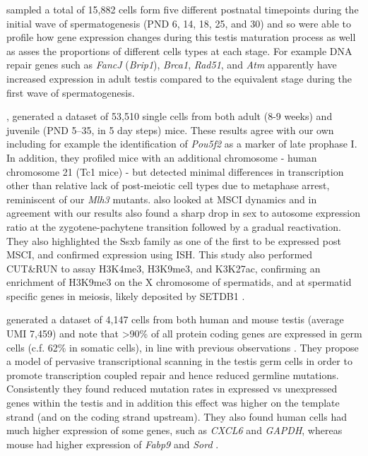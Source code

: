 \cite{Grive2019Dynamic} sampled a total of 15,882 cells form five different postnatal timepoints during the initial wave of spermatogenesis (PND 6, 14, 18, 25, and 30) and so were able to profile how gene expression changes during this testis maturation process as well as asses the proportions of different cells types at each stage. For example DNA repair genes such as \textit{FancJ} (\textit{Brip1}), \textit{Brca1}, \textit{Rad51}, and \textit{Atm} apparently have increased expression in adult testis compared to the equivalent stage during the first wave of spermatogenesis.

\cite{Ernst2019Staged}, generated a dataset of 53,510 single cells from both adult (8-9 weeks) and juvenile (PND 5–35, in 5 day steps) mice. These results agree with our own including for example the identification of \textit{Pou5f2} as a marker of late prophase I. In addition, they profiled mice with an additional chromosome - human chromosome 21 (Tc1 mice) - but detected minimal differences in transcription other than relative lack of post-meiotic cell types due to metaphase arrest, reminiscent of our \textit{Mlh3} mutants. \cite{Ernst2019Staged} also looked at MSCI dynamics and in agreement with our results also found a sharp drop in sex to autosome expression ratio at the zygotene-pachytene transition followed by a gradual reactivation. They also highlighted the Ssxb family as one of the first to be expressed post MSCI, and confirmed expression using ISH. This study also performed CUT\&RUN to assay H3K4me3, H3K9me3, and K3K27ac, confirming an enrichment of H3K9me3 on the X chromosome of spermatids, and at spermatid specific genes in meiosis, likely deposited by SETDB1 \parencite{Hirota2018SETDB1}.

\cite{Xia2019Widespread} generated a dataset of 4,147 cells from both human and mouse testis (average UMI 7,459) and note that >90\% of all protein coding genes are expressed in germ cells (c.f. 62\% in somatic cells), in line with previous observations \parencite{Soumillon2013Cellular, Schmidt1996Transcriptional}. They propose a model of pervasive transcriptional scanning in the testis germ cells in order to promote transcription coupled repair and hence reduced germline mutations. Consistently they found reduced mutation rates in expressed vs unexpressed genes within the testis and in addition this effect was higher on the template strand (and on the coding strand upstream). They also found human cells had much higher expression of some genes, such as \textit{CXCL6} and \textit{GAPDH}, whereas mouse had higher expression of \textit{Fabp9} and \textit{Sord} \parencite{Xia2019Widespread}.

